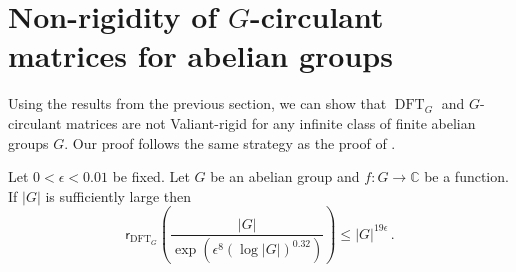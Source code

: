 \documentclass{toc}
\renewcommand\C{{\mathbb{C}}}
\DeclareMathOperator{\DFT}{DFT}
\begin{document}
%


%
\section{Non-rigidity of
 \texorpdfstring{$G$}{G}-circulant matrices for abelian groups}\label{sec_groupalgebra}
Using the results from the previous section, we can show that %
$\DFT_G$ and %
$G$-circulant matrices are not Valiant-rigid for any
%
infinite class of finite abelian groups $G$.  %
Our proof follows the same strategy as
the proof of .

%
\begin{theorem}\label{DFTabelian}
Let $0 < \epsilon < 0.01$ be fixed.  Let $G$ be an abelian group and $f: G \rightarrow \C$ be a function.  If $|G|$ is sufficiently large then
\[
\textsf{r}_{\DFT_G}\left(\frac{|G|}{\exp\left(\epsilon^8 (\log |G|)^{0.32}\right)}\right) \leq  |G|^{19 \epsilon} \,.
\]
\end{theorem}
\end{document}
